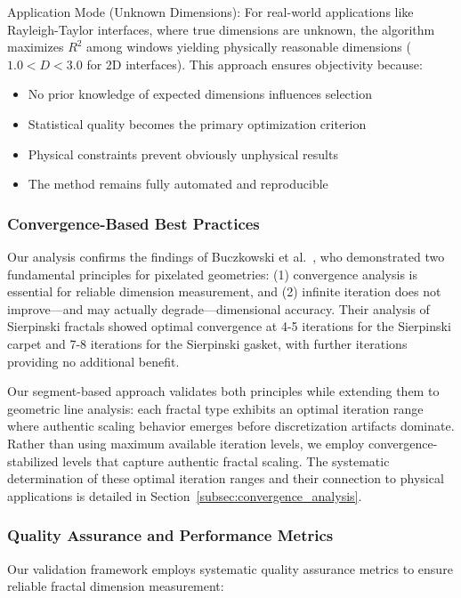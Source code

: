 \documentclass[preprint,12pt]{elsarticle}
\def\textbf#1{#1}%
\begin{document}
\textbf{Application Mode (Unknown Dimensions)}:
For real-world applications like Rayleigh-Taylor interfaces, where true dimensions are unknown, the algorithm maximizes $R^2$ among windows yielding physically reasonable dimensions ($1.0 < D < 3.0$ for 2D interfaces). This approach ensures objectivity because:
\begin{itemize}
\item No prior knowledge of expected dimensions influences selection
\item Statistical quality becomes the primary optimization criterion
\item Physical constraints prevent obviously unphysical results
\item The method remains fully automated and reproducible
\end{itemize}

\subsubsection{Convergence-Based Best Practices}

Our analysis confirms the findings of Buczkowski et al.~\cite{buczkowski1998}, who demonstrated two fundamental principles for pixelated geometries: (1) convergence analysis is essential for reliable dimension measurement, and (2) infinite iteration does not improve—and may actually degrade—dimensional accuracy. Their analysis of Sierpinski fractals showed optimal convergence at 4-5 iterations for the Sierpinski carpet and 7-8 iterations for the Sierpinski gasket, with further iterations providing no additional benefit.

Our segment-based approach validates both principles while extending them to geometric line analysis: each fractal type exhibits an optimal iteration range where authentic scaling behavior emerges before discretization artifacts dominate. Rather than using maximum available iteration levels, we employ convergence-stabilized levels that capture authentic fractal scaling. The systematic determination of these optimal iteration ranges and their connection to physical applications is detailed in Section~\ref{subsec:convergence_analysis}.

\subsubsection{Quality Assurance and Performance Metrics}

Our validation framework employs systematic quality assurance metrics to ensure reliable fractal dimension measurement:
\end{document}
